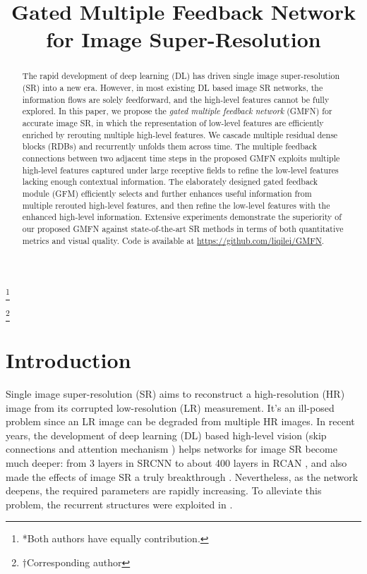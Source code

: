 \documentclass{bmvc2k}
\title{Gated Multiple Feedback Network for Image Super-Resolution}
\newcommand\blfootnote[1]{\begingroup
	\renewcommand\thefootnote{}\footnote{#1}\addtocounter{footnote}{-1}\endgroup
}
\begin{document}
	
	\maketitle
	
\blfootnote{*Both authors have equally contribution.}
\blfootnote{$\dagger$Corresponding author}	
		\vspace{-\topsep}
	\begin{abstract}
		The rapid development of deep learning (DL) has driven single image super-resolution (SR) into a new era. However, in most existing DL based image SR networks, the information flows are solely feedforward, and the high-level features cannot be fully explored. In this paper, we propose the \textit{gated multiple feedback network} (GMFN) for accurate image SR, in which the representation of low-level features are efficiently enriched by rerouting multiple high-level features. We cascade multiple residual dense blocks (RDBs) and recurrently unfolds them across time. The multiple feedback connections between two adjacent time steps in the proposed GMFN exploits multiple high-level features captured under large receptive fields to refine the low-level features lacking enough contextual information. The elaborately designed gated feedback module (GFM) efficiently selects and further enhances useful information from multiple rerouted high-level features, and then refine the low-level features with the enhanced high-level information. Extensive experiments demonstrate the superiority of our proposed GMFN against state-of-the-art SR methods in terms of both quantitative metrics and visual quality. Code is available at \url{https://github.com/liqilei/GMFN}.
	\end{abstract}
	
	
	\section{Introduction}
	\label{sec:intro}
	\setlength{\parskip}{0.5\baselineskip}
	Single image super-resolution (SR) aims to reconstruct a high-resolution (HR) image from its corrupted low-resolution (LR) measurement. It's an ill-posed problem since an LR image can be degraded from multiple HR images. In recent years, the development of deep learning (DL) based high-level vision (skip connections \cite{he2016deep, huang2017densely} and attention mechanism \cite{hu2018squeeze}) helps networks for image SR become much deeper: from 3 layers in SRCNN \cite{dong2014learning} to about 400 layers in RCAN \cite{zhang2018image}, and also made the effects of image SR a truly breakthrough \cite{kim2016accurate, dong2016accelerating, lim2017enhanced, tong2017image, haris2018deep, zhang2018residual}. Nevertheless, as the network deepens, the required parameters are rapidly increasing. To alleviate this problem, the recurrent structures were exploited in \cite{kim2016deeply, tai2017image, han2018image,li2019srfbn}.
	
\end{document}
